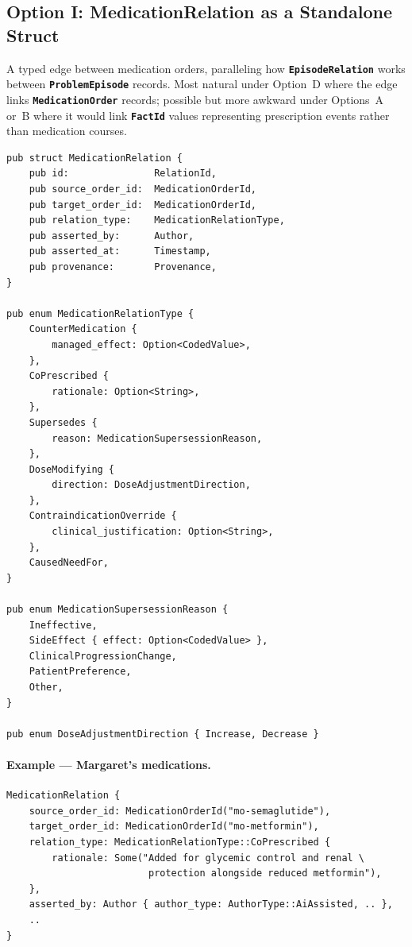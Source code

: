 \documentclass[11pt]{article}
\newcommand{\entity}[1]{\texttt{\textbf{#1}}}
\begin{document}
\subsection{Option I: MedicationRelation as a Standalone Struct}
\label{sec:interaction-option-i}

A typed edge between medication orders, paralleling how
\entity{EpisodeRelation} works between \entity{ProblemEpisode} records.
Most natural under Option~D where the edge links
\entity{MedicationOrder} records; possible but more awkward under
Options~A or~B where it would link \entity{FactId} values representing
prescription events rather than medication courses.

\begin{lstlisting}
pub struct MedicationRelation {
    pub id:               RelationId,
    pub source_order_id:  MedicationOrderId,
    pub target_order_id:  MedicationOrderId,
    pub relation_type:    MedicationRelationType,
    pub asserted_by:      Author,
    pub asserted_at:      Timestamp,
    pub provenance:       Provenance,
}

pub enum MedicationRelationType {
    CounterMedication {
        managed_effect: Option<CodedValue>,
    },
    CoPrescribed {
        rationale: Option<String>,
    },
    Supersedes {
        reason: MedicationSupersessionReason,
    },
    DoseModifying {
        direction: DoseAdjustmentDirection,
    },
    ContraindicationOverride {
        clinical_justification: Option<String>,
    },
    CausedNeedFor,
}

pub enum MedicationSupersessionReason {
    Ineffective,
    SideEffect { effect: Option<CodedValue> },
    ClinicalProgressionChange,
    PatientPreference,
    Other,
}

pub enum DoseAdjustmentDirection { Increase, Decrease }
\end{lstlisting}

\paragraph{Example --- Margaret's medications.}

\begin{lstlisting}
MedicationRelation {
    source_order_id: MedicationOrderId("mo-semaglutide"),
    target_order_id: MedicationOrderId("mo-metformin"),
    relation_type: MedicationRelationType::CoPrescribed {
        rationale: Some("Added for glycemic control and renal \
                         protection alongside reduced metformin"),
    },
    asserted_by: Author { author_type: AuthorType::AiAssisted, .. },
    ..
}
\end{lstlisting}
\end{document}
